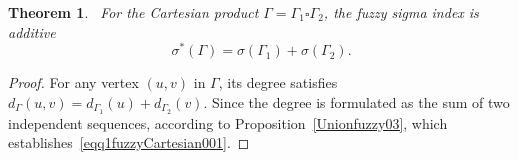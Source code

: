 \documentclass[12pt]{amsart}
\newtheorem{theorem}{Theorem}[section]
\newcommand{\SF}{\sigma^*}
\begin{document}
\begin{theorem}~\label{fuzzyCartesian001}
For the Cartesian product $\Gamma = \Gamma_1 \square \Gamma_2$, the fuzzy sigma index is additive
\begin{equation}~\label{eqq1fuzzyCartesian001}
\SF(\Gamma) = \sigma(\Gamma_1) + \sigma(\Gamma_2).
\end{equation}
\end{theorem}
\begin{proof}
For any vertex $(u,v)$ in $\Gamma$, its degree satisfies $d_{\Gamma}(u,v) = d_{\Gamma_1}(u)+d_{\Gamma_2}(v)$. Since the degree is formulated as the sum of two independent sequences, according to Proposition~\ref{Unionfuzzy03}, which establishes~\eqref{eqq1fuzzyCartesian001}. 
\end{proof}

\end{document}
